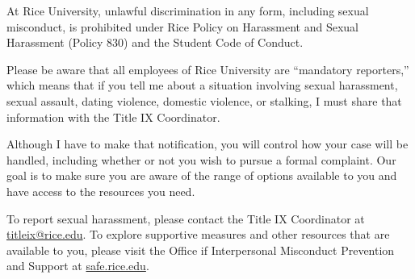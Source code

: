 \documentclass[11pt]{article}
\begin{document}
At Rice University, unlawful discrimination in any form, including sexual misconduct, is prohibited under Rice Policy on Harassment and Sexual Harassment (Policy 830) and the Student Code of Conduct.

Please be aware that all employees of Rice University are “mandatory reporters,” which means that if you tell me about a situation involving sexual harassment, sexual assault, dating violence, domestic violence, or stalking, I must share that information with the Title IX Coordinator.

Although I have to make that notification, you will control how your case will be handled, including whether or not you wish to pursue a formal complaint. Our goal is to make sure you are aware of the range of options available to you and have access to the resources you need.

To report sexual harassment, please contact the Title IX Coordinator at \href{mailto:titleix@rice.edu}{titleix@rice.edu}. To explore supportive measures and other resources that are available to you, please visit the Office if Interpersonal Misconduct Prevention and Support at \href{https://safe.rice.edu}{safe.rice.edu}.
\end{document}
